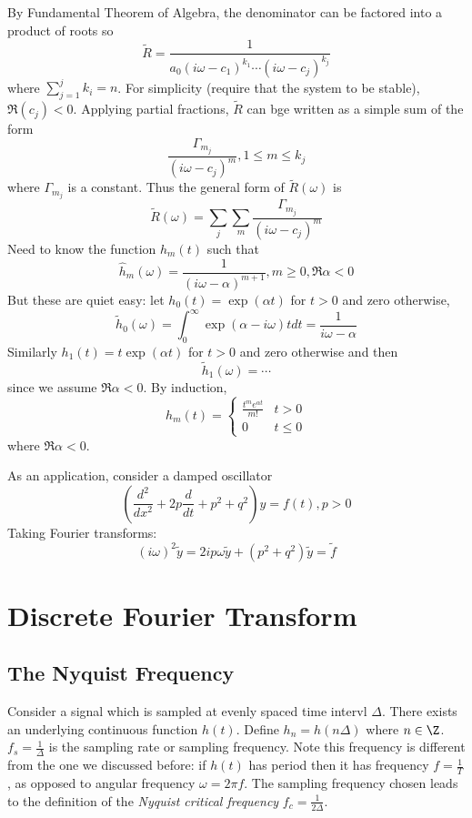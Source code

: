 \documentclass[a4paper]{article}
\newcommand*{\ft}{\tilde}
\begin{document}
By Fundamental Theorem of Algebra, the denominator can be factored into a product of roots so
\[
  \ft R = \frac{1}{a_0 (i\omega - c_1)^{k_1} \cdots (i\omega - c_j)^{k_j}}
\]
where \(\sum_{j = 1}^j k_i = n\). For simplicity (require that the system to be stable), \(\Re(c_j) < 0\). Applying partial fractions, \(\ft R\) can bge written as a simple sum of the form
\[
  \frac{\Gamma_{m_j}}{(i\omega - c_j)^m}, 1\leq m \leq k_j
\]
where  \(\Gamma_{m_j}\) is a constant. Thus the general form of \(\ft R(\omega)\) is
\[
  \ft R(\omega) = \sum_j \sum_m \frac{\Gamma_{m_j}}{(i\omega - c_j)^m}
\]
Need to know the function \(h_m(t)\) such that
\[
  \hat h_m(\omega) = \frac{1}{(i\omega - \alpha)^{m + 1}}, m \geq 0, \Re \alpha < 0
\]
But these are quiet easy: let \(h_0(t) = \exp(\alpha t)\) for \(t > 0\) and zero otherwise,
\[
  \ft h_0(\omega) = \int_{0}^{\infty} \exp(\alpha - i\omega)t dt = \frac{1}{i\omega - \alpha}
\]
Similarly \(h_1(t) = t\exp(\alpha t)\) for \(t > 0\) and zero otherwise and then
\[
  \ft h_1(\omega) = \cdots
\]
since we assume \(\Re \alpha < 0\). By induction,
\[
  h_m(t) =
  \begin{cases}
    \frac{t^me^{\alpha t}}{m!} & t > 0 \\
    0 & t \leq 0
  \end{cases}
\]
where \(\Re \alpha < 0\).

As an application, consider a damped oscillator
\[
  \left( \frac{d^2}{dx^2} + 2p \frac{d}{dt} + p^2 + q^2 \right) y = f(t), p > 0
\]
Taking Fourier transforms:
\[
  (i\omega)^2 \ft y = 2ip \omega \ft y + (p^2 + q^2) \ft y = \ft f
\]

\section{Discrete Fourier Transform}

\subsection{The Nyquist Frequency}

Consider a signal which is sampled at evenly spaced time intervl \(\Delta\). There exists an underlying continuous function \(h(t)\). Define \(h_n = h(n \Delta)\) where \(n \in \Z\). \(f_s = \frac{1}{\Delta}\) is the sampling rate or sampling frequency. Note this frequency is different from the one we discussed before: if \(h(t)\) has period then it has frequency \(f = \frac{1}{T}\), as opposed to angular frequency \(\omega = 2\pi f\). The sampling frequency chosen leads to the definition of the \emph{Nyquist critical frequency} \(f_c = \frac{1}{2\Delta}\).
\end{document}
